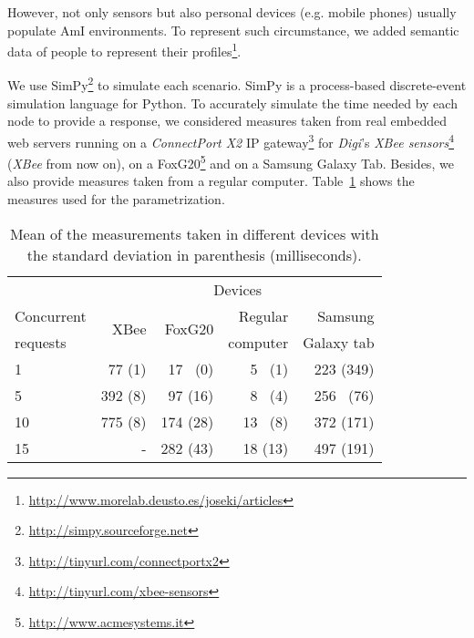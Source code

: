 However, not only sensors but also personal devices (e.g. mobile phones) usually populate AmI environments.
To represent such circumstance, we added semantic data of people to represent their profiles\footnote{\url{http://www.morelab.deusto.es/joseki/articles}}. %

We use SimPy\footnote{\url{http://simpy.sourceforge.net}} to simulate each scenario.
SimPy is a process-based discrete-event simulation language for Python.
To accurately simulate the time needed by each node to provide a response, we considered measures taken from
real embedded web servers running on a \textit{ConnectPort X2} IP gateway\footnote{\url{http://tinyurl.com/connectportx2}} for \textit{Digi}'s \textit{XBee sensors}\footnote{\url{http://tinyurl.com/xbee-sensors}} (\textit{XBee} from now on),
on a FoxG20\footnote{\url{http://www.acmesystems.it}} and on a Samsung Galaxy Tab.
Besides, we also provide measures taken from a regular computer.
Table~\ref{tab:measures_embedded} shows the measures used for the parametrization.


\begin{table}
  \begin{center}
	\begin{tabular}{p{2.5cm} r r r r}
	  \hline
	  & \multicolumn{4}{c}{Devices} \\
	  \cline{2-5}
	  Concurrent & \multirow{2}{*}{XBee} & \multirow{2}{*}{FoxG20} & Regular  & Samsung \\
	  requests   &  ~    &   ~     & computer & Galaxy tab \\
	  \hline
	  1  &  77 (1)	&  17 ~(0)  &   5 ~(1)  &  223 (349) \\
	  5  & 392 (8)	&  97 (16) &   8 ~(4)  &  256 ~(76)  \\
	  10 & 775 (8)	& 174 (28) &  13 ~(8)  &  372 (171) \\
	  15 &  -   	& 282 (43) &  18 (13) &  497 (191) \\
	  \hline
	\end{tabular}
  \end{center}
  \caption{Mean of the measurements taken in different devices with the standard deviation in parenthesis (milliseconds).}
  \label{tab:measures_embedded}
\end{table}


